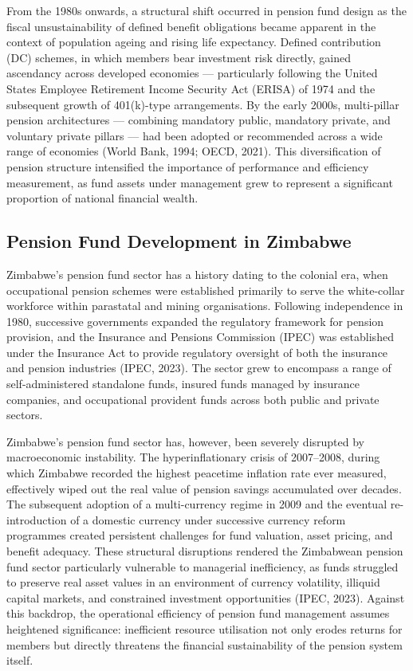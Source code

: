 \documentclass[12pt,a4paper]{article}
\begin{document}
From the 1980s onwards, a structural shift occurred in pension fund design as the fiscal unsustainability of defined benefit obligations became apparent in the context of population ageing and rising life expectancy. Defined contribution (DC) schemes, in which members bear investment risk directly, gained ascendancy across developed economies --- particularly following the United States Employee Retirement Income Security Act (ERISA) of 1974 and the subsequent growth of 401(k)-type arrangements. By the early 2000s, multi-pillar pension architectures --- combining mandatory public, mandatory private, and voluntary private pillars --- had been adopted or recommended across a wide range of economies (World Bank, 1994; OECD, 2021). This diversification of pension structure intensified the importance of performance and efficiency measurement, as fund assets under management grew to represent a significant proportion of national financial wealth.

\subsection{Pension Fund Development in Zimbabwe}

Zimbabwe's pension fund sector has a history dating to the colonial era, when occupational pension schemes were established primarily to serve the white-collar workforce within parastatal and mining organisations. Following independence in 1980, successive governments expanded the regulatory framework for pension provision, and the Insurance and Pensions Commission (IPEC) was established under the Insurance Act to provide regulatory oversight of both the insurance and pension industries (IPEC, 2023). The sector grew to encompass a range of self-administered standalone funds, insured funds managed by insurance companies, and occupational provident funds across both public and private sectors.

Zimbabwe's pension fund sector has, however, been severely disrupted by macroeconomic instability. The hyperinflationary crisis of 2007--2008, during which Zimbabwe recorded the highest peacetime inflation rate ever measured, effectively wiped out the real value of pension savings accumulated over decades. The subsequent adoption of a multi-currency regime in 2009 and the eventual re-introduction of a domestic currency under successive currency reform programmes created persistent challenges for fund valuation, asset pricing, and benefit adequacy. These structural disruptions rendered the Zimbabwean pension fund sector particularly vulnerable to managerial inefficiency, as funds struggled to preserve real asset values in an environment of currency volatility, illiquid capital markets, and constrained investment opportunities (IPEC, 2023). Against this backdrop, the operational efficiency of pension fund management assumes heightened significance: inefficient resource utilisation not only erodes returns for members but directly threatens the financial sustainability of the pension system itself.
\end{document}
